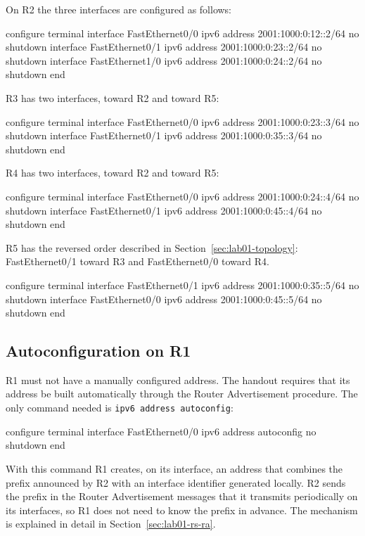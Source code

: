 On R2 the three interfaces are configured as follows:

\begin{codeblock}
configure terminal
interface FastEthernet0/0
 ipv6 address 2001:1000:0:12::2/64
 no shutdown
interface FastEthernet0/1
 ipv6 address 2001:1000:0:23::2/64
 no shutdown
interface FastEthernet1/0
 ipv6 address 2001:1000:0:24::2/64
 no shutdown
end
\end{codeblock}

R3 has two interfaces, toward R2 and toward R5:

\begin{codeblock}
configure terminal
interface FastEthernet0/0
 ipv6 address 2001:1000:0:23::3/64
 no shutdown
interface FastEthernet0/1
 ipv6 address 2001:1000:0:35::3/64
 no shutdown
end
\end{codeblock}

R4 has two interfaces, toward R2 and toward R5:

\begin{codeblock}
configure terminal
interface FastEthernet0/0
 ipv6 address 2001:1000:0:24::4/64
 no shutdown
interface FastEthernet0/1
 ipv6 address 2001:1000:0:45::4/64
 no shutdown
end
\end{codeblock}

R5 has the reversed order described in Section~\ref{sec:lab01-topology}: FastEthernet0/1 toward R3 and FastEthernet0/0 toward R4.

\begin{codeblock}
configure terminal
interface FastEthernet0/1
 ipv6 address 2001:1000:0:35::5/64
 no shutdown
interface FastEthernet0/0
 ipv6 address 2001:1000:0:45::5/64
 no shutdown
end
\end{codeblock}

\subsection{Autoconfiguration on R1}
\label{sec:lab01-autoconfig}

R1 must not have a manually configured address. The handout requires that its address be built automatically through the Router Advertisement procedure. The only command needed is \texttt{ipv6 address autoconfig}:

\begin{codeblock}
configure terminal
interface FastEthernet0/0
 ipv6 address autoconfig
 no shutdown
end
\end{codeblock}

With this command R1 creates, on its interface, an address that combines the prefix announced by R2 with an interface identifier generated locally. R2 sends the prefix in the Router Advertisement messages that it transmits periodically on its interfaces, so R1 does not need to know the prefix in advance. The mechanism is explained in detail in Section~\ref{sec:lab01-rs-ra}.

